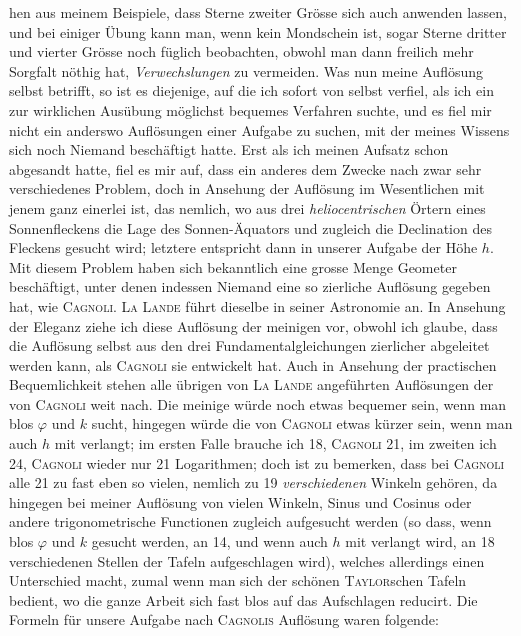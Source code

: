 hen aus meinem Beispiele, dass Sterne zweiter Grösse sich auch anwenden lassen, und bei einiger Übung kann man, wenn kein Mondschein ist, sogar Sterne dritter und vierter Grösse noch füglich beobachten, obwohl man dann freilich mehr Sorgfalt nöthig hat, \emph{Verwechslungen} zu vermeiden. Was nun meine Auflösung selbst betrifft, so ist es diejenige, auf die ich sofort von selbst verfiel, als ich ein zur wirklichen Ausübung möglichst bequemes Verfahren suchte, und es fiel mir nicht ein anderswo Auflösungen einer Aufgabe zu suchen, mit der meines Wissens sich noch Niemand beschäftigt hatte. Erst als ich meinen Aufsatz schon abgesandt hatte, fiel es mir auf, dass ein anderes dem Zwecke nach zwar sehr verschiedenes Problem, doch in Ansehung der Auflösung im Wesentlichen mit jenem ganz einerlei ist, das nemlich, wo aus drei \emph{heliocentrischen} Örtern eines Sonnenfleckens die Lage des Sonnen-Äquators und zugleich die Declination des Fleckens gesucht wird; letztere entspricht dann in unserer Aufgabe der Höhe $h$. Mit diesem Problem haben sich bekanntlich eine grosse Menge Geometer beschäftigt, unter denen indessen Niemand eine so zierliche Auflösung gegeben hat, wie \textsc{Cagnoli}. \textsc{La Lande} führt dieselbe in seiner Astronomie an. In Ansehung der Eleganz ziehe ich diese Auflösung der meinigen vor, obwohl ich glaube, dass die Auflösung selbst aus den drei Fundamentalgleichungen zierlicher abgeleitet werden kann, als \textsc{Cagnoli} sie entwickelt hat. Auch in Ansehung der practischen Bequemlichkeit stehen alle übrigen von \textsc{La Lande} angeführten Auflösungen der von \textsc{Cagnoli} weit nach. Die meinige würde noch etwas bequemer sein, wenn man blos $\varphi$ und $k$ sucht, hingegen würde die von \textsc{Cagnoli} etwas kürzer sein, wenn man auch $h$ mit verlangt; im ersten Falle brauche ich 18, \textsc{Cagnoli} 21, im zweiten ich 24, \textsc{Cagnoli} wieder nur 21 Logarithmen; doch ist zu bemerken, dass bei \textsc{Cagnoli} alle 21 zu fast eben so vielen, nemlich zu 19 \emph{verschiedenen} Winkeln gehören, da hingegen bei meiner Auflösung von vielen Winkeln, Sinus und Cosinus oder andere trigonometrische Functionen zugleich aufgesucht werden (so dass, wenn blos $\varphi$ und $k$ gesucht werden, an 14, und wenn auch $h$ mit verlangt wird, an 18 verschiedenen Stellen der Tafeln aufgeschlagen wird), welches allerdings einen Unterschied macht, zumal wenn man sich der schönen \textsc{Taylor}schen Tafeln bedient, wo die ganze Arbeit sich fast blos auf das Aufschlagen reducirt. Die Formeln für unsere Aufgabe nach \textsc{Cagnolis} Auflösung waren folgende:

